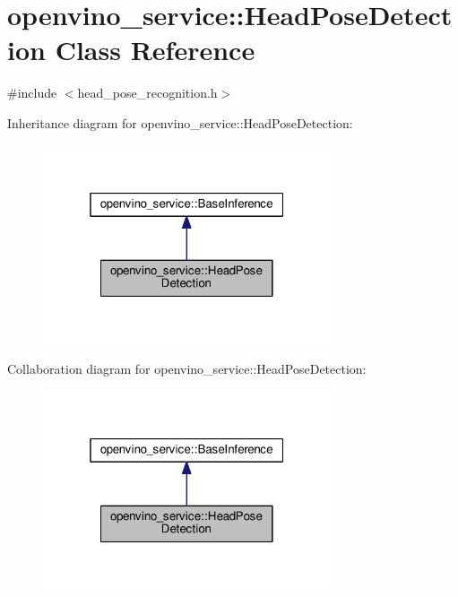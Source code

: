\hypertarget{classopenvino__service_1_1HeadPoseDetection}{}\section{openvino\+\_\+service\+:\+:Head\+Pose\+Detection Class Reference}
\label{classopenvino__service_1_1HeadPoseDetection}


{\ttfamily \#include $<$head\+\_\+pose\+\_\+recognition.\+h$>$}



Inheritance diagram for openvino\+\_\+service\+:\+:Head\+Pose\+Detection\+:
\nopagebreak
\begin{figure}[H]
\begin{center}
\leavevmode
\includegraphics[width=241pt]{classopenvino__service_1_1HeadPoseDetection__inherit__graph}
\end{center}
\end{figure}


Collaboration diagram for openvino\+\_\+service\+:\+:Head\+Pose\+Detection\+:
\nopagebreak
\begin{figure}[H]
\begin{center}
\leavevmode
\includegraphics[width=241pt]{classopenvino__service_1_1HeadPoseDetection__coll__graph}
\end{center}
\end{figure}
